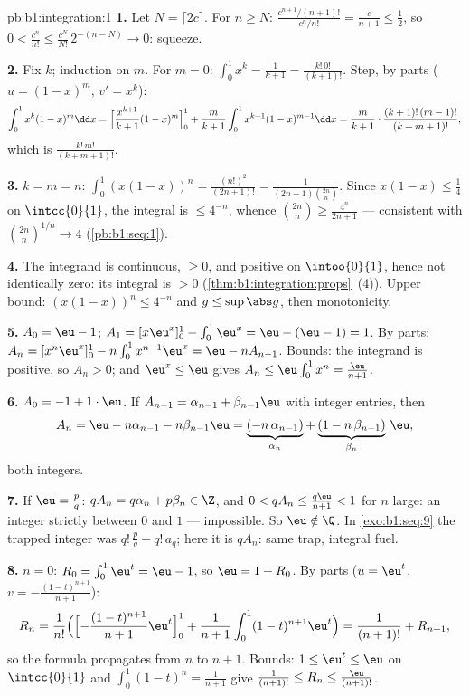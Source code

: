 \begin{solution}{pb:b1:integration:1}
\textbf{1.} Let $N = \lceil 2c \rceil$. For $n \geq N$:
$\frac{c^{n+1}/(n+1)!}{c^n/n!} = \frac{c}{n+1} \leq \frac12$, so
$0 < \frac{c^n}{n!} \leq \frac{c^N}{N!}\,2^{-(n - N)} \to 0$:
squeeze.

\textbf{2.} Fix $k$; induction on $m$. For $m = 0$: $\int_0^1
x^k = \frac{1}{k+1} = \frac{k!\,0!}{(k+1)!}$. Step, by parts
($u = (1-x)^m$, $v' = x^k$):
\[
\int_0^1 x^k (1-x)^m \dd x
= \Bigl[\frac{x^{k+1}}{k+1}(1-x)^m\Bigr]_0^1
+ \frac{m}{k+1}\int_0^1 x^{k+1}(1-x)^{m-1}\dd x
= \frac{m}{k+1}\cdot\frac{(k+1)!\,(m-1)!}{(k+m+1)!} ,
\]
which is $\frac{k!\,m!}{(k+m+1)!}$.

\textbf{3.} $k = m = n$: $\int_0^1 (x(1-x))^n =
\frac{(n!)^2}{(2n+1)!} = \frac{1}{(2n+1)\binom{2n}{n}}$. Since
$x(1-x) \leq \frac14$ on $\intcc{0}{1}$, the integral is $\leq
4^{-n}$, whence $\binom{2n}{n} \geq \frac{4^n}{2n+1}$ ---
consistent with $\binom{2n}{n}^{1/n} \to 4$
(\cref{pb:b1:seq:1}).

\textbf{4.} The integrand is continuous, $\geq 0$, and positive
on $\intoo{0}{1}$, hence not identically zero: its integral is
$> 0$ (\cref{thm:b1:integration:props}~(4)). Upper bound:
$(x(1-x))^n \leq 4^{-n}$ and $g \leq \sup\abs g$, then
monotonicity.

\textbf{5.} $A_0 = \eu - 1$; $A_1 = [x\eu^x]_0^1 - \int_0^1
\eu^x = \eu - (\eu - 1) = 1$. By parts: $A_n = [x^n \eu^x]_0^1 -
n\int_0^1 x^{n-1}\eu^x = \eu - n A_{n-1}$. Bounds: the integrand
is positive, so $A_n > 0$; and $\eu^x \leq \eu$ gives $A_n \leq
\eu\int_0^1 x^n = \frac{\eu}{n+1}$.

\textbf{6.} $A_0 = -1 + 1\cdot\eu$. If $A_{n-1} = \alpha_{n-1} +
\beta_{n-1}\eu$ with integer entries, then
\[
A_n = \eu - n\alpha_{n-1} - n\beta_{n-1}\eu
= \underbrace{(-n\,\alpha_{n-1})}_{\alpha_n}
+ \underbrace{(1 - n\,\beta_{n-1})}_{\beta_n}\,\eu ,
\]
both integers.

\textbf{7.} If $\eu = \frac pq$: $q A_n = q\alpha_n + p\beta_n
\in \Z$, and $0 < qA_n \leq \frac{q\eu}{n+1} < 1$ for $n$ large:
an integer strictly between $0$ and $1$ --- impossible. So $\eu
\notin \Q$. In \cref{exo:b1:seq:9} the trapped integer was
$q!\,\frac pq - q!\,a_q$; here it is $qA_n$: same trap,
integral fuel.

\textbf{8.} $n = 0$: $R_0 = \int_0^1 \eu^t = \eu - 1$, so $\eu =
1 + R_0$. By parts ($u = \eu^t$, $v = -\frac{(1-t)^{n+1}}{n+1}$):
\[
R_n = \frac{1}{n!}\Bigl(\Bigl[-\frac{(1-t)^{n+1}}{n+1}
\eu^t\Bigr]_0^1 + \frac{1}{n+1}\int_0^1 (1-t)^{n+1}\eu^t\Bigr)
= \frac{1}{(n+1)!} + R_{n+1} ,
\]
so the formula propagates from $n$ to $n + 1$. Bounds: $1 \leq
\eu^t \leq \eu$ on $\intcc{0}{1}$ and $\int_0^1 (1-t)^n =
\frac{1}{n+1}$ give $\frac{1}{(n+1)!} \leq R_n \leq
\frac{\eu}{(n+1)!}$.


\end{solution}
